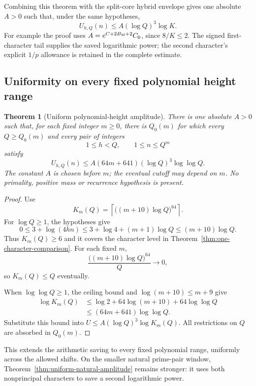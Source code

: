 \documentclass[11pt]{article}
\newtheorem{theorem}{Theorem}[section]
\begin{document}
Combining this theorem with the split-core hybrid envelope gives one
absolute \(A>0\) such that, under the same hypotheses,
\[
                         U_{h,Q}(n)\leq
                              A(\log Q)^3\log K.
\]
For example the proof uses \(A=e^{C+2B_{\rm M}+2}C_0\), since
\(8/K\leq2\). The signed first-character tail supplies the saved
logarithmic power; the second character's explicit \(1/p\) allowance
is retained in the complete estimate.

\subsection{Uniformity on every fixed polynomial height range}
\begin{theorem}[Uniform polynomial-height amplitude]\label{thm:polynomial-height-amplitude}
There is one absolute \(A>0\) such that, for each fixed integer
\(m\geq0\), there is \(Q_0(m)\) for which every \(Q\geq Q_0(m)\) and
every pair of integers
\[
                      1\leq h<Q,\qquad1\leq n\leq Q^m
\]
satisfy
\[
 U_{h,Q}(n)\leq
          A(64m+641)(\log Q)^3\log\log Q.
\]
The constant \(A\) is chosen before \(m\); the eventual cutoff may
depend on \(m\). No primality, positive mass or recurrence hypothesis
is present.
\end{theorem}
\begin{proof}
Use
\[
 K_m(Q)=\left\lceil\bigl((m+10)\log Q\bigr)^{64}\right\rceil.
\]
For \(\log Q\geq1\), the hypotheses give
\[
 0\leq3+\log(4hn)\leq3+\log4+(m+1)\log Q
                           \leq(m+10)\log Q.
\]
Thus \(K_m(Q)\geq6\) and it covers the character level in
Theorem~\ref{thm:one-character-comparison}. For each fixed \(m\),
\[
             \frac{\bigl((m+10)\log Q\bigr)^{64}}Q\longrightarrow0,
\]
so \(K_m(Q)\leq Q\) eventually.

When \(\log\log Q\geq1\), the ceiling bound and
\(\log(m+10)\leq m+9\) give
\begin{align*}
 \log K_m(Q)
 &\leq\log2+64\log(m+10)+64\log\log Q\\
 &\leq(64m+641)\log\log Q.
\end{align*}
Substitute this bound into \(U\leq A(\log Q)^3\log K_m(Q)\).
All restrictions on \(Q\) are absorbed in \(Q_0(m)\).
\end{proof}

This extends the arithmetic saving to every fixed polynomial range,
uniformly across the allowed shifts. On the smaller natural
prime-pair window, Theorem~\ref{thm:uniform-natural-amplitude} remains
stronger: it uses both nonprincipal characters to save a second
logarithmic power.
\end{document}
